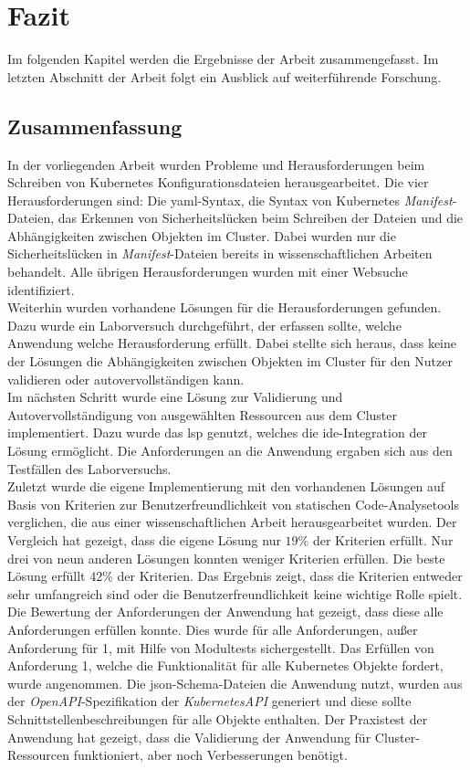 \chapter{Fazit}\label{ch:conclusion}
Im folgenden Kapitel werden die Ergebnisse der Arbeit zusammengefasst. Im letzten Abschnitt
der Arbeit folgt ein Ausblick auf weiterführende Forschung.

\section{Zusammenfassung}

In der vorliegenden Arbeit wurden Probleme und Herausforderungen beim Schreiben
von Kubernetes Konfigurationsdateien herausgearbeitet.
Die vier Herausforderungen sind: Die \ac{yaml}-Syntax, die Syntax von Kubernetes \textit{Manifest}-Dateien,
das Erkennen von Sicherheitslücken beim Schreiben der Dateien und die Abhängigkeiten zwischen Objekten im Cluster.
Dabei wurden nur die Sicherheitslücken in \textit{Manifest}-Dateien bereits in wissenschaftlichen Arbeiten behandelt.
Alle übrigen Herausforderungen wurden mit einer Websuche identifiziert.
\\
Weiterhin wurden vorhandene Lösungen für die Herausforderungen gefunden.
Dazu wurde ein Laborversuch durchgeführt, der erfassen sollte, welche Anwendung welche Herausforderung erfüllt.
Dabei stellte sich heraus, dass keine der Lösungen die Abhängigkeiten zwischen Objekten im Cluster
für den Nutzer validieren oder autovervollständigen kann.
\\
Im nächsten Schritt wurde eine Lösung zur Validierung und Autovervollständigung von ausgewählten
Ressourcen aus dem Cluster implementiert. Dazu wurde das \ac{lsp} genutzt, welches die
\ac{ide}-Integration der Lösung ermöglicht.
Die Anforderungen an die Anwendung ergaben sich aus den Testfällen des Laborversuchs.
\\
Zuletzt wurde die eigene Implementierung mit den vorhandenen Lösungen auf Basis
von Kriterien zur Benutzerfreundlichkeit von statischen Code-Analysetools verglichen, die aus einer wissenschaftlichen Arbeit herausgearbeitet
wurden. Der Vergleich hat gezeigt, dass die eigene Lösung nur $19\%$ der Kriterien erfüllt.
Nur drei von neun anderen Lösungen konnten weniger Kriterien erfüllen.
Die beste Lösung erfüllt $42\%$ der Kriterien.
Das Ergebnis zeigt, dass die Kriterien entweder sehr umfangreich sind oder die Benutzerfreundlichkeit
keine wichtige Rolle spielt.
\\
Die Bewertung der Anforderungen der Anwendung hat gezeigt, dass diese alle Anforderungen erfüllen konnte.
Dies wurde für alle Anforderungen, außer Anforderung für 1, mit Hilfe von Modultests sichergestellt.
Das Erfüllen von Anforderung 1, welche die Funktionalität für alle Kubernetes Objekte fordert, wurde angenommen.
Die \ac{json}-Schema-Dateien die Anwendung nutzt, wurden aus der \textit{OpenAPI}-Spezifikation der \textit{KubernetesAPI} generiert
und diese sollte Schnittstellenbeschreibungen für alle Objekte enthalten.
Der Praxistest der Anwendung hat gezeigt, dass die Validierung der Anwendung für Cluster-Ressourcen
funktioniert, aber noch Verbesserungen benötigt.

